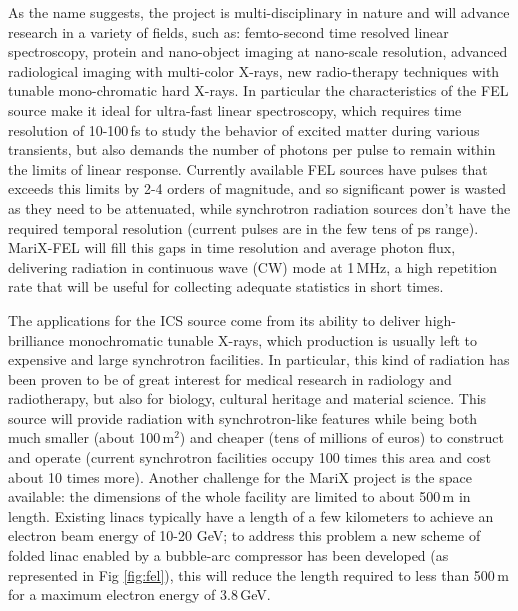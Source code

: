 As the name suggests, the project is multi-disciplinary in nature and will advance research in a variety of fields, such as: femto-second time resolved linear spectroscopy, protein and nano-object imaging at nano-scale resolution, advanced radiological imaging with multi-color X-rays, new radio-therapy techniques with tunable mono-chromatic hard X-rays.
In particular the characteristics of the FEL source make it ideal for ultra-fast linear spectroscopy, which requires time resolution of 10-100\,fs to study the behavior of excited matter during various transients, but also demands the number of photons per pulse to remain within the limits of linear response. Currently available FEL sources have pulses that exceeds this limits by 2-4 orders of magnitude, and so significant power is wasted as they need to be attenuated, while synchrotron radiation sources don't have the required temporal resolution (current pulses are in the few tens of ps range). MariX-FEL will fill this gaps in time resolution and average photon flux, delivering radiation in continuous wave (CW) mode at 1\,MHz, a high repetition rate that will be useful for collecting adequate statistics in short times.

The applications for the ICS source come from its ability to deliver high-brilliance monochromatic tunable X-rays, which production is usually left to expensive and large synchrotron facilities. In particular, this kind of radiation has been proven to be of great interest for medical research in radiology and radiotherapy, but also for biology, cultural heritage and material science. This source will provide radiation with synchrotron-like features while being both much smaller (about 100\,m$^2$) and cheaper (tens of millions of euros) to construct and operate (current synchrotron facilities occupy 100 times this area and cost about 10 times more).
Another challenge for the MariX project is the space available: the dimensions of the whole facility are limited to about 500\,m in length. Existing linacs typically have a length of a few kilometers to achieve an electron beam energy of 10-20 GeV; to address this problem a new scheme of folded linac enabled by a bubble-arc compressor  has been developed (as represented in Fig \ref{fig:fel}), this will reduce the length required to less than 500\,m for a maximum electron energy of 3.8\,GeV.

